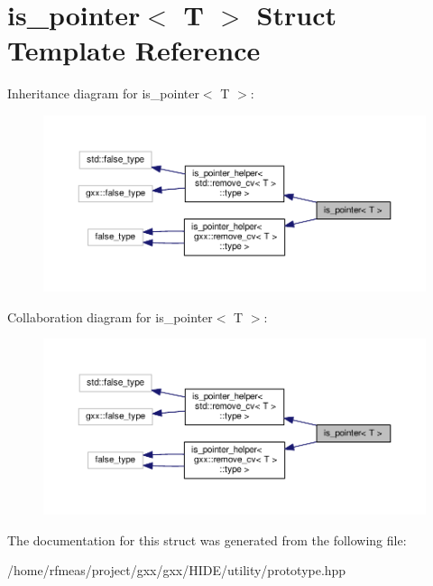 \hypertarget{structis__pointer}{}\section{is\+\_\+pointer$<$ T $>$ Struct Template Reference}
\label{structis__pointer}


Inheritance diagram for is\+\_\+pointer$<$ T $>$\+:
\nopagebreak
\begin{figure}[H]
\begin{center}
\leavevmode
\includegraphics[width=350pt]{structis__pointer__inherit__graph}
\end{center}
\end{figure}


Collaboration diagram for is\+\_\+pointer$<$ T $>$\+:
\nopagebreak
\begin{figure}[H]
\begin{center}
\leavevmode
\includegraphics[width=350pt]{structis__pointer__coll__graph}
\end{center}
\end{figure}


The documentation for this struct was generated from the following file\+:\begin{DoxyCompactItemize}
\item 
/home/rfmeas/project/gxx/gxx/\+H\+I\+D\+E/utility/prototype.\+hpp\end{DoxyCompactItemize}
